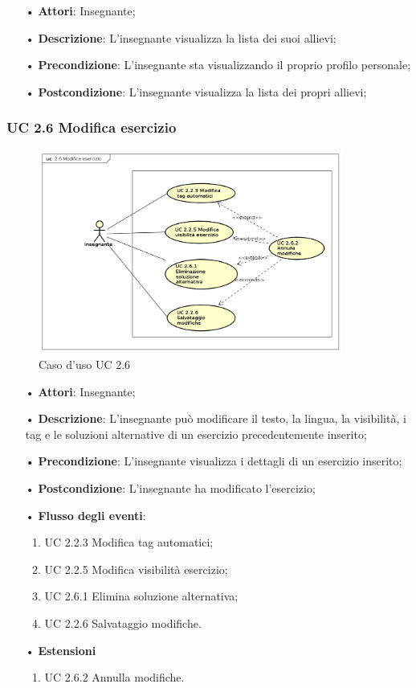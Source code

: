 \begin{itemize}
	\item[•] \textbf{Attori}: Insegnante;
	\item[•] \textbf{Descrizione}: L’insegnante visualizza la lista dei suoi allievi;
	\item[•] \textbf{Precondizione}: L'insegnante sta visualizzando il proprio profilo personale;
	\item[•] \textbf{Postcondizione}: L’insegnante visualizza la lista dei propri allievi;
\end{itemize}



\subsubsection{UC 2.6 Modifica esercizio}
\begin{figure}[H]
\centering
\includegraphics[width=10cm]{img/UC26.png} 
\caption{Caso d'uso UC 2.6}
\end{figure}

\begin{itemize}
	\item[•] \textbf{Attori}: Insegnante;
	\item[•] \textbf{Descrizione}: L’insegnante può modificare il testo, la lingua, la visibilità, i tag e le soluzioni alternative di un esercizio precedentemente inserito;
	\item[•] \textbf{Precondizione}: L'insegnante visualizza i dettagli di un esercizio inserito;
	\item[•] \textbf{Postcondizione}: L’insegnante ha modificato l'esercizio;
	\item[•] \textbf{Flusso degli eventi}:
		\begin{enumerate}
			\item UC 2.2.3 Modifica tag automatici;
			\item UC 2.2.5 Modifica visibilità esercizio;
			\item UC 2.6.1 Elimina soluzione alternativa;
			\item UC 2.2.6 Salvataggio modifiche.
		\end{enumerate}
	\item[•] \textbf{Estensioni}
	\begin{enumerate}
		\item UC 2.6.2 Annulla modifiche.
	\end{enumerate}
\end{itemize}   

